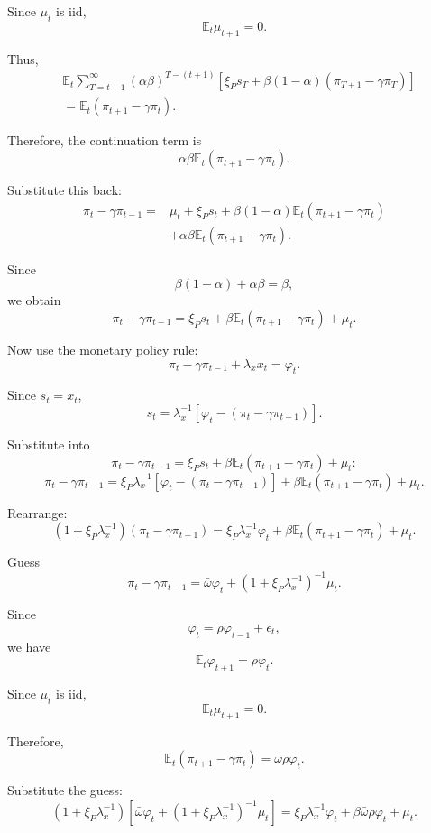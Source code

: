 \documentclass[12pt]{article}
\begin{document}
Since $\mu_t$ is iid,
\[
\mathbb{E}_t\mu_{t+1}=0.
\]

Thus,
\[
\begin{aligned}
&\mathbb{E}_t
\sum_{T=t+1}^{\infty}
(\alpha\beta)^{T-(t+1)}
\left[
\xi_P s_T
+
\beta(1-\alpha)(\pi_{T+1}-\gamma\pi_T)
\right] \\
&=
\mathbb{E}_t(\pi_{t+1}-\gamma\pi_t).
\end{aligned}
\]

Therefore, the continuation term is
\[
\alpha\beta\mathbb{E}_t(\pi_{t+1}-\gamma\pi_t).
\]

Substitute this back:
\[
\begin{aligned}
\pi_t-\gamma\pi_{t-1}
=
&\mu_t
+
\xi_P s_t
+
\beta(1-\alpha)\mathbb{E}_t(\pi_{t+1}-\gamma\pi_t) \\
&+
\alpha\beta\mathbb{E}_t(\pi_{t+1}-\gamma\pi_t).
\end{aligned}
\]

Since
\[
\beta(1-\alpha)+\alpha\beta=\beta,
\]
we obtain
\[
\boxed{
\pi_t-\gamma\pi_{t-1}
=
\xi_P s_t
+
\beta\mathbb{E}_t(\pi_{t+1}-\gamma\pi_t)
+
\mu_t.
}
\]

Now use the monetary policy rule:
\[
\pi_t-\gamma\pi_{t-1}+\lambda_x x_t=\varphi_t.
\]

Since $s_t=x_t$,
\[
s_t
=
\lambda_x^{-1}
\left[
\varphi_t-(\pi_t-\gamma\pi_{t-1})
\right].
\]

Substitute into
\[
\pi_t-\gamma\pi_{t-1}
=
\xi_P s_t
+
\beta\mathbb{E}_t(\pi_{t+1}-\gamma\pi_t)
+
\mu_t:
\]
\[
\pi_t-\gamma\pi_{t-1}
=
\xi_P\lambda_x^{-1}
\left[
\varphi_t-(\pi_t-\gamma\pi_{t-1})
\right]
+
\beta\mathbb{E}_t(\pi_{t+1}-\gamma\pi_t)
+
\mu_t.
\]

Rearrange:
\[
(1+\xi_P\lambda_x^{-1})
(\pi_t-\gamma\pi_{t-1})
=
\xi_P\lambda_x^{-1}\varphi_t
+
\beta\mathbb{E}_t(\pi_{t+1}-\gamma\pi_t)
+
\mu_t.
\]

Guess
\[
\pi_t-\gamma\pi_{t-1}
=
\bar{\omega}\varphi_t
+
(1+\xi_P\lambda_x^{-1})^{-1}\mu_t.
\]

Since
\[
\varphi_t=\rho\varphi_{t-1}+\epsilon_t,
\]
we have
\[
\mathbb{E}_t\varphi_{t+1}=\rho\varphi_t.
\]

Since $\mu_t$ is iid,
\[
\mathbb{E}_t\mu_{t+1}=0.
\]

Therefore,
\[
\mathbb{E}_t(\pi_{t+1}-\gamma\pi_t)
=
\bar{\omega}\rho\varphi_t.
\]

Substitute the guess:
\[
(1+\xi_P\lambda_x^{-1})
\left[
\bar{\omega}\varphi_t
+
(1+\xi_P\lambda_x^{-1})^{-1}\mu_t
\right]
=
\xi_P\lambda_x^{-1}\varphi_t
+
\beta\bar{\omega}\rho\varphi_t
+
\mu_t.
\]
\end{document}

